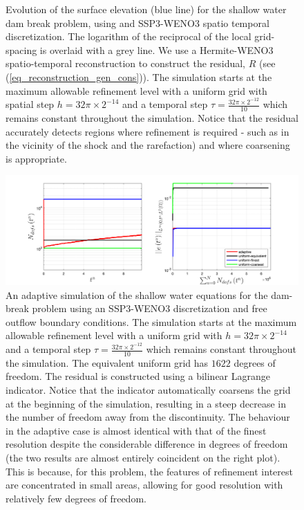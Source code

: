 \documentclass[final]{amsart}
\numberwithin{equation}{section}
\begin{document}
\begin{figure}[H]
\begin{subfigure}[b]{.25\textwidth}
	\caption{
		\label{fig_shw_dambreakSHW_dambreak_RK3_WENO3_rec_3_fixed_gs_stills_7001_adaptONOFF}
	}
\end{subfigure}
	\caption{\label{fig:SSP3WENO_shw_stills} Evolution of the surface elevation (blue line) for the shallow water dam break problem, using and SSP3-WENO3 spatio temporal discretization.  The logarithm of the reciprocal of the local grid-spacing is overlaid with a grey line. We use a Hermite-WENO3 spatio-temporal reconstruction to construct the residual, $R$ (see (\ref{eq_reconstruction_gen_cons})). The simulation starts at the maximum allowable refinement level with a uniform grid with spatial step $h=32\pi \times 2^{-14}$ and a temporal step $\tau =\frac{32\pi\times2^{-12}}{10}$ which remains constant throughout the simulation.  Notice that the residual accurately detects regions where refinement is required - such as in the vicinity of the shock and the rarefaction) and where coarsening is appropriate.}
\end{figure}


\begin{figure}[H]
\centering
\includegraphics[width=\textwidth]{../figures/fig_SHW_dambreak_RK3_WENO3_rec_3_fixed_gsplots_1x5_shw_dambreak_comparison_adaptONOFF}	
	\caption{\label{fig:SSP3WENO3_shw_dambreak_adapt} An adaptive simulation of the shallow water equations for the dam-break problem using an SSP3-WENO3 discretization and free outflow boundary conditions.  The simulation starts at the maximum allowable refinement level with a uniform grid with $h=32\pi \times 2^{-14}$ and a temporal step $\tau =\frac{32\pi\times2^{-12}}{10}$ which remains constant throughout the simulation. The equivalent uniform grid has $1622$ degrees of freedom.  The residual is constructed using a bilinear Lagrange indicator.  Notice that the indicator automatically coarsens the grid at the beginning of the simulation, resulting in a steep decrease in the number of freedom away from the discontinuity. The behaviour in the adaptive case is almost identical with that of the finest resolution despite the considerable difference in degrees of freedom (the two results are almost entirely coincident on the right plot).  This is because, for this problem, the features of refinement interest are concentrated in small areas, allowing for good resolution with relatively few degrees of freedom. }
\end{figure}
\end{document}
